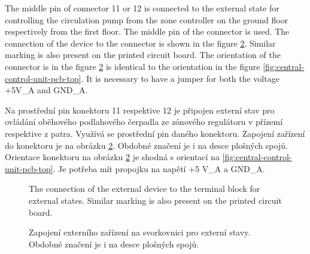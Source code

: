 \begin{English}
\end{English}

\begin{Czech}
\end{Czech}


\begin{English}
The middle pin of connector 11 or 12 is connected to the external state for controlling the circulation pump from the zone controller on the ground floor respectively from the first floor. The middle pin of the connector is used.
The connection of the device to the connector is shown in the figure \ref{fig:terminal-block-external-state}. Similar marking is also present on the printed circuit board. The orientation of the connector is in the figure \ref{fig:terminal-block-external-state} is identical to the orientation in the figure \ref{fig:central-control-unit-pcb-top}. It is necessary to have a jumper for both the voltage +5V\_A and GND\_A.
\end{English}

\begin{Czech}
Na prostřední pin konektoru 11 respektive 12 je připojen externí stav pro ovládání oběhového podlahového čerpadla ze zónového regulátoru v přízemí respektive z patra. Využívá se prostřední pin daného konektoru. Zapojení zařízení do konektoru je na obrázku \ref{fig:terminal-block-external-state}. Obdobné značení je i na desce plošných spojů. Orientace konektoru na obrázku \ref{fig:terminal-block-external-state} je shodná s orientací na \ref{fig:central-control-unit-pcb-top}. Je potřeba mít propojku na napětí +5 V\_A a  GND\_A.
\end{Czech}


\begin{English}
\begin{figure}[H]
    \centering
    \def\svgwidth{0.15\columnwidth}
    \graphicspath{{pictures/all/hardware/svg/}}
    
    \caption{The connection of the external device to the terminal block for external states. Similar marking is also present on the printed circuit board.}
    \label{fig:terminal-block-external-state}
\end{figure}
\end{English}

\begin{Czech}
\begin{figure}[H]
    \centering
    \def\svgwidth{0.15\columnwidth}
    \graphicspath{{pictures/all/hardware/svg/}}
    
    \caption{Zapojení externího zařízení na svorkovnici pro externí stavy. Obdobné značení je i na desce plošných spojů.}
    \label{fig:terminal-block-external-state}
\end{figure}
\end{Czech}


